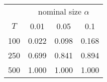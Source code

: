 % 
\begin{tabular}{cccc}
  \hline
  & \multicolumn{3}{c}{nominal size $\alpha$} \\
 $T$ & 0.01 & 0.05 & 0.1 \\
 \hline
100 & 0.022 & 0.098 & 0.168 \\ 
  250 & 0.699 & 0.841 & 0.894 \\ 
  500 & 1.000 & 1.000 & 1.000 \\ 
   \hline
\end{tabular}
